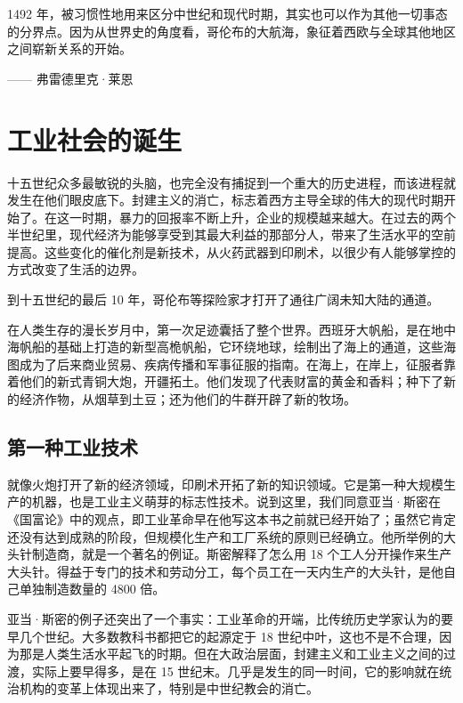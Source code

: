 \begin{tcolorbox}
1492 年，被习惯性地用来区分中世纪和现代时期，其实也可以作为其他一切事态的分界点。因为从世界史的角度看，哥伦布的大航海，象征着西欧与全球其他地区之间崭新关系的开始。
\begin{flushright}
—— 弗雷德里克·莱恩
\end{flushright}
\end{tcolorbox}


\section{工业社会的诞生}
十五世纪众多最敏锐的头脑，也完全没有捕捉到一个重大的历史进程，而该进程就发生在他们眼皮底下。封建主义的消亡，标志着西方主导全球的伟大的现代时期开始了。在这一时期，暴力的回报率不断上升，企业的规模越来越大。在过去的两个半世纪里，现代经济为能够享受到其最大利益的那部分人，带来了生活水平的空前提高。这些变化的催化剂是新技术，从火药武器到印刷术，以很少有人能够掌控的方式改变了生活的边界。

到十五世纪的最后 10 年，哥伦布等探险家才打开了通往广阔未知大陆的通道。

在人类生存的漫长岁月中，第一次足迹囊括了整个世界。西班牙大帆船，是在地中海帆船的基础上打造的新型高桅帆船，它环绕地球，绘制出了海上的通道，这些海图成为了后来商业贸易、疾病传播和军事征服的指南。在海上，在岸上，征服者靠着他们的新式青铜大炮，开疆拓土。他们发现了代表财富的黄金和香料；种下了新的经济作物，从烟草到土豆；还为他们的牛群开辟了新的牧场。

\subsection{第一种工业技术}
就像火炮打开了新的经济领域，印刷术开拓了新的知识领域。它是第一种大规模生产的机器，也是工业主义萌芽的标志性技术。说到这里，我们同意亚当·斯密在《国富论》中的观点，即工业革命早在他写这本书之前就已经开始了；虽然它肯定还没有达到成熟的阶段，但规模化生产和工厂系统的原则已经确立。他所举例的大头针制造商，就是一个著名的例证。斯密解释了怎么用 18 个工人分开操作来生产大头针。得益于专门的技术和劳动分工，每个员工在一天内生产的大头针，是他自己单独制造数量的 4800 倍。

亚当·斯密的例子还突出了一个事实：工业革命的开端，比传统历史学家认为的要早几个世纪。大多数教科书都把它的起源定于 18 世纪中叶，这也不是不合理，因为那是人类生活水平起飞的时期。但在大政治层面，封建主义和工业主义之间的过渡，实际上要早得多，是在 15 世纪末。几乎是发生的同一时间，它的影响就在统治机构的变革上体现出来了，特别是中世纪教会的消亡。

